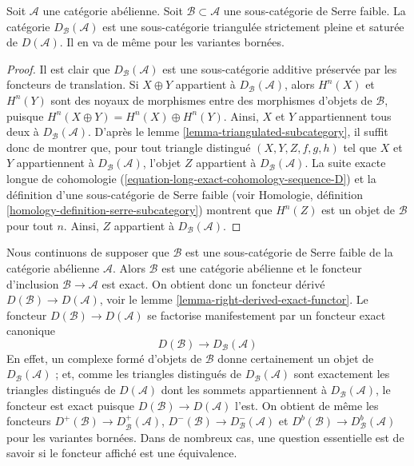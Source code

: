 \begin{lemma}
\label{lemma-cohomology-in-serre-subcategory}
Soit $\mathcal{A}$ une catégorie abélienne. Soit
$\mathcal{B} \subset \mathcal{A}$ une sous-catégorie de Serre faible. La
catégorie $D_\mathcal{B}(\mathcal{A})$ est une sous-catégorie triangulée
strictement pleine et saturée de $D(\mathcal{A})$. Il en va de même pour les
variantes bornées.
\end{lemma}

\begin{proof}
Il est clair que $D_\mathcal{B}(\mathcal{A})$ est une sous-catégorie additive
préservée par les foncteurs de translation. Si $X \oplus Y$ appartient à
$D_\mathcal{B}(\mathcal{A})$, alors $H^n(X)$ et $H^n(Y)$ sont des noyaux de
morphismes entre des morphismes d'objets de $\mathcal{B}$, puisque
$H^n(X \oplus Y) = H^n(X) \oplus H^n(Y)$. Ainsi, $X$ et $Y$ appartiennent
tous deux à $D_\mathcal{B}(\mathcal{A})$. D'après le
lemme \ref{lemma-triangulated-subcategory}, il suffit donc de montrer que, pour
tout triangle distingué $(X, Y, Z, f, g, h)$ tel que $X$ et $Y$ appartiennent
à $D_\mathcal{B}(\mathcal{A})$, l'objet $Z$ appartient à
$D_\mathcal{B}(\mathcal{A})$. La suite exacte longue de cohomologie
(\ref{equation-long-exact-cohomology-sequence-D}) et la définition d'une
sous-catégorie de Serre faible (voir Homologie, définition
\ref{homology-definition-serre-subcategory}) montrent que $H^n(Z)$ est un
objet de $\mathcal{B}$ pour tout $n$. Ainsi, $Z$ appartient à
$D_\mathcal{B}(\mathcal{A})$.
\end{proof}

\noindent
Nous continuons de supposer que $\mathcal{B}$ est une sous-catégorie de Serre
faible de la catégorie abélienne $\mathcal{A}$. Alors $\mathcal{B}$ est une
catégorie abélienne et le foncteur d'inclusion
$\mathcal{B} \to \mathcal{A}$ est exact. On obtient donc un foncteur dérivé
$D(\mathcal{B}) \to D(\mathcal{A})$, voir le
lemme \ref{lemma-right-derived-exact-functor}. Le foncteur
$D(\mathcal{B}) \to D(\mathcal{A})$ se factorise manifestement par un foncteur
exact canonique
\begin{equation}
\label{equation-compare}
D(\mathcal{B}) \longrightarrow D_\mathcal{B}(\mathcal{A})
\end{equation}
En effet, un complexe formé d'objets de $\mathcal{B}$ donne certainement un
objet de $D_\mathcal{B}(\mathcal{A})$ ; et, comme les triangles distingués de
$D_\mathcal{B}(\mathcal{A})$ sont exactement les triangles distingués de
$D(\mathcal{A})$ dont les sommets appartiennent à
$D_\mathcal{B}(\mathcal{A})$, le foncteur est exact puisque
$D(\mathcal{B}) \to D(\mathcal{A})$ l'est. On obtient de même les foncteurs
$D^+(\mathcal{B}) \to D^+_\mathcal{B}(\mathcal{A})$,
$D^-(\mathcal{B}) \to D^-_\mathcal{B}(\mathcal{A})$ et
$D^b(\mathcal{B}) \to D^b_\mathcal{B}(\mathcal{A})$ pour les variantes
bornées. Dans de nombreux cas, une question essentielle est de savoir si le
foncteur affiché est une équivalence.

